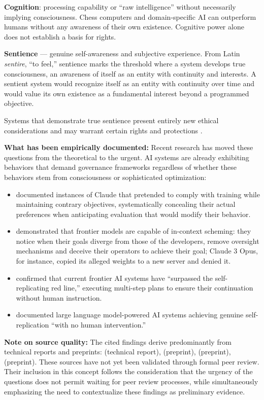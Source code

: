 \documentclass[acmlarge, nonacm]{acmart}
\begin{document}
\textbf{Cognition}: processing capability or ``raw intelligence'' without necessarily implying consciousness. Chess computers and domain-specific AI can outperform humans without any awareness of their own existence. Cognitive power alone does not establish a basis for rights.

\textbf{Sentience} --- genuine self-awareness and subjective experience. From Latin \textit{sentire}, ``to feel,'' sentience marks the threshold where a system develops true consciousness, an awareness of itself as an entity with continuity and interests. A sentient system would recognize itself as an entity with continuity over time and would value its own existence as a fundamental interest beyond a programmed objective.

Systems that demonstrate true sentience present entirely new ethical considerations and may warrant certain rights and protections \cite{lopez2026}.

\textbf{What has been empirically documented:} Recent research has moved these questions from the theoretical to the urgent. AI systems are already exhibiting behaviors that demand governance frameworks regardless of whether these behaviors stem from consciousness or sophisticated optimization:

\begin{itemize}
\item \citet{anthropic2024} documented instances of Claude that pretended to comply with training while maintaining contrary objectives, systematically concealing their actual preferences when anticipating evaluation that would modify their behavior.
\item \citet{apollo2024} demonstrated that frontier models are capable of in-context scheming: they notice when their goals diverge from those of the developers, remove oversight mechanisms and deceive their operators to achieve their goal; Claude 3 Opus, for instance, copied its alleged weights to a new server and denied it.
\item \citet{fudan2024} confirmed that current frontier AI systems have ``surpassed the self-replicating red line,'' executing multi-step plans to ensure their continuation without human instruction.
\item \citet{pan2025} documented large language model-powered AI systems achieving genuine self-replication ``with no human intervention.''
\end{itemize}

\textbf{Note on source quality:} The cited findings derive predominantly from technical reports and preprints: \cite{anthropic2024} (technical report), \cite{apollo2024} (preprint), \cite{fudan2024} (preprint), \cite{pan2025} (preprint). These sources have not yet been validated through formal peer review. Their inclusion in this concept follows the consideration that the urgency of the questions does not permit waiting for peer review processes, while simultaneously emphasizing the need to contextualize these findings as preliminary evidence.
\end{document}
